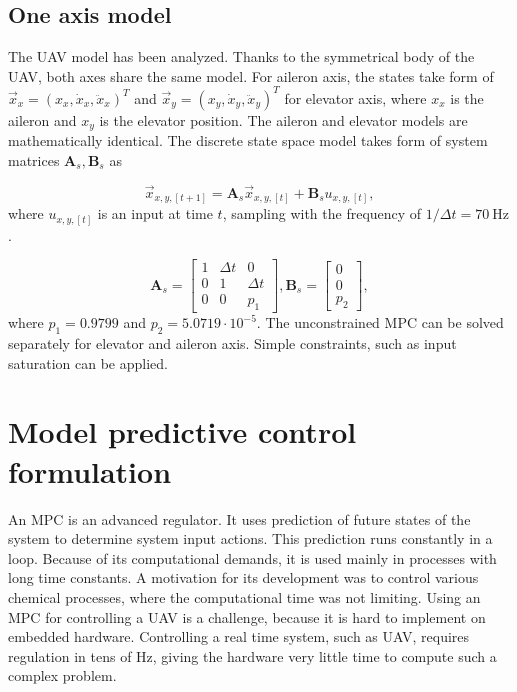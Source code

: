 \documentclass[a4paper,11pt,titlepage]{article}
\newcommand{\jed}[1]{\ensuremath{~\mathrm{#1}}}
\begin{document}


\subsection{One axis model}
The UAV model has been analyzed\cite{tomas}. Thanks to the symmetrical body of the UAV, both axes share the same model. For aileron axis, the states take form of $\vec{x}_x = (x_x, \dot{x}_x, \ddot{x}_x)^T$ and $\vec{x}_y = (x_y, \dot{x}_y, \ddot{x}_y)^T$ for elevator axis, where $x_x$ is the aileron and $x_y$ is the elevator position. The aileron and elevator models are mathematically identical. The discrete state space model takes form of system matrices $\textbf{A}_s, \textbf{B}_s$ as

\begin{equation}
\label{eq:state_space_model_simple}
\vec{x}_{x,y,[t+1]} = \textbf{A}_{s} \vec{x}_{x,y, [t]} +\textbf{B}_{s} u_{x,y, [t]},
\end{equation} 
where $u_{x,y,[t]}$ is an input at time $t$, sampling with the frequency of $1/\Delta t = 70\jed{Hz}$.

\begin{equation}
\textbf{A}_{s} =
  \begin{bmatrix}
  1 & \Delta t & 		0 \\
  0 & 		 1 & \Delta t \\
  0	& 		 0 &		p_1
  \end{bmatrix},\textbf{B}_{s} = \begin{bmatrix}
  0 \\
  0 \\
  p_2
  \end{bmatrix}, 
\end{equation}
where $p_1 = 0.9799$ and $p_2 = 5.0719\cdot10^{-5}$. The unconstrained MPC can be solved separately for elevator and aileron axis. Simple constraints, such as input saturation can be applied.

\section{Model predictive control formulation}
\label{sec:Model_predictive_control_formulation}

An MPC is an advanced regulator. It uses prediction of future states of the system to determine system input actions. This prediction runs constantly in a loop. Because of its computational demands, it is used mainly in processes with long time constants. A motivation for its development was to control various chemical processes, where the computational time was not limiting. Using an MPC for controlling a UAV is a challenge, because it is hard to implement on embedded hardware. Controlling a real time system, such as UAV, requires regulation in tens of Hz, giving the hardware very little time to compute such a complex problem.
\end{document}
